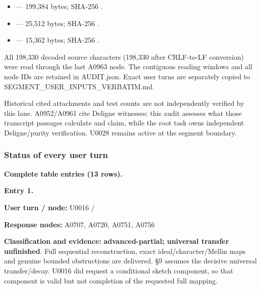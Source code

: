 \begin{itemize}
\tightlist
\item
  \protect{}
  --- 199,384 bytes; SHA-256
  \protect{}.
\item
  \protect{}
  --- 25,512 bytes; SHA-256
  \protect{}.
\item
  \protect{} ---
  15,362 bytes; SHA-256
  \protect{}.
\end{itemize}

All 198,330 decoded source characters (198,330 after CRLF-to-LF
conversion) were read through the last A0963 node. The contiguous
reading windows and all node IDs are retained in AUDIT.json. Exact user
turns are separately copied to SEGMENT\_USER\_INPUTS\_VERBATIM.md.

Historical cited attachments and test counts are not independently
verified by this lane. A0952/A0961 cite Deligne witnesses; this audit
assesses what those transcript passages calculate and claim, while the
root task owns independent Deligne/purity verification. U0028 remains
active at the segment boundary.

\subsubsection{Status of every user
turn}\label{status-of-every-user-turn}

\textbf{Complete table entries (13 rows).}


\textbf{Entry 1.}

\textbf{User turn / node:} U0016 /
\protect{}

\textbf{Response nodes:} A0707, A0720, A0751, A0756

\textbf{Classification and evidence:} \textbf{advanced-partial;
universal transfer unfinished}. Full sequential reconstruction, exact
ideal/character/Mellin maps and genuine bounded obstructions are
delivered. §9 assumes the decisive universal transfer/decay. U0016 did
request a conditional sketch component, so that component is valid but
not completion of the requested full mapping.

